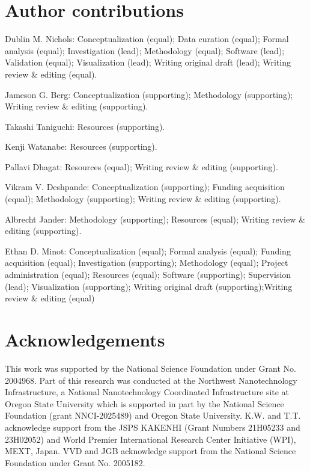 \documentclass{beavtex_dub_edit}
\begin{document}
\section{Author contributions}

Dublin M. Nichols: Conceptualization (equal); Data curation (equal); Formal analysis (equal); Investigation (lead); Methodology (equal); Software (lead); Validation (equal); Visualization (lead); Writing \textemdash original draft (lead); Writing \textemdash review \& editing (equal). 

\noindent
Jameson G. Berg: Conceptualization (supporting); Methodology (supporting); Writing \textemdash review \& editing (supporting). 

\noindent
Takashi Taniguchi: Resources (supporting). 

\noindent
Kenji Watanabe: Resources (supporting). 

\noindent
Pallavi Dhagat: Resources (equal); Writing \textemdash review \& editing (supporting). 

\noindent
Vikram V. Deshpande: Conceptualization (supporting); Funding acquisition (equal); Methodology (supporting); Writing \textemdash review \& editing (supporting). 

\noindent
Albrecht Jander: Methodology (supporting); Resources (equal); Writing \textemdash review \& editing (supporting). 

\noindent
Ethan D. Minot: Conceptualization (equal); Formal analysis (equal); Funding acquisition (equal); Investigation (supporting); Methodology (equal); Project administration (equal); Resources (equal); Software (supporting); Supervision (lead); Visualization (supporting); Writing \textemdash original draft (supporting);Writing \textemdash review \& editing (equal)

\section{Acknowledgements}
This work was supported by the National Science Foundation under Grant No. 2004968. Part of this research was conducted at the Northwest Nanotechnology Infrastructure, a National Nanotechnology Coordinated Infrastructure site at Oregon State University which is supported in part by the National Science Foundation (grant NNCI-2025489) and Oregon State University.
K.W. and T.T. acknowledge support from the JSPS KAKENHI (Grant Numbers 21H05233 and 23H02052) and World Premier International Research Center Initiative (WPI), MEXT, Japan. 
VVD and JGB acknowledge support from the National Science Foundation under Grant No. 2005182.
\end{document}
